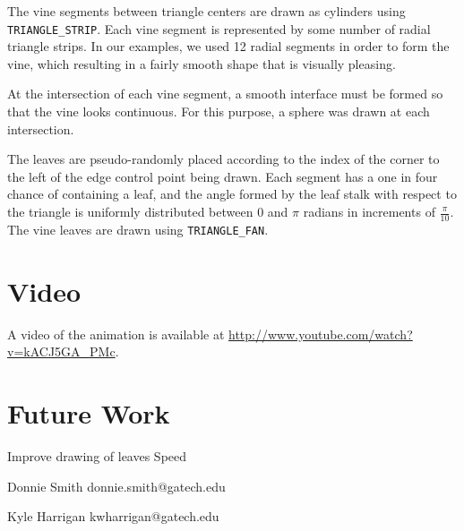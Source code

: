 \documentclass[letterpaper,10pt]{IEEEtran}
\begin{document}
The vine segments between triangle centers are drawn as cylinders using  \verb+TRIANGLE_STRIP+.
Each vine segment is represented by some number of radial triangle strips.
In our examples, we used 12 radial segments in order to form the vine, which resulting in a fairly smooth shape that is visually pleasing.

At the intersection of each vine segment, a smooth interface must be formed so that the vine looks continuous.
For this purpose, a sphere was drawn at each intersection.

The leaves are pseudo-randomly placed according to the index of the corner to the left of the edge control point being drawn.
Each segment has a one in four chance of containing a leaf, and the angle formed by the leaf stalk with respect to the triangle is uniformly distributed between 0 and $\pi$ radians in increments of $\frac{\pi}{10}$.
The vine leaves are drawn using \verb+TRIANGLE_FAN+.

\section{Video}
A video of the animation is available at \href{http://www.youtube.com/watch?v=kACJ5GA_PMc}{http://www.youtube.com/watch?v=kACJ5GA\_PMc}.

\section{Future Work}

Improve drawing of leaves
Speed


\begin{IEEEbiography}{Donnie Smith} donnie.smith@gatech.edu
\end{IEEEbiography}

\begin{IEEEbiography}{Kyle Harrigan} kwharrigan@gatech.edu
\end{IEEEbiography}
\end{document}
